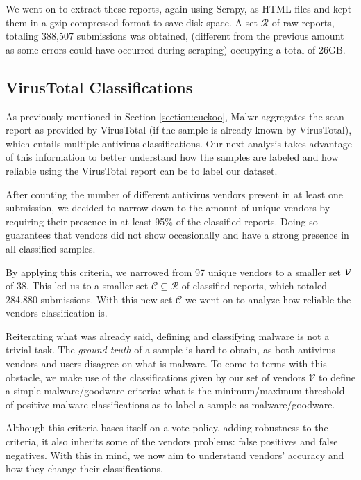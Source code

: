 We went on to extract these reports, again using Scrapy, as HTML files and kept them in a gzip compressed format to save disk space.
A set $\mathcal{R}$ of raw reports, totaling 388,507 submissions was obtained, (different from the
previous amount as some errors could have occurred during scraping) occupying a total of 26GB.

\subsection{VirusTotal Classifications}
\label{subsection:virustotal_classifications}

As previously mentioned in Section \ref{section:cuckoo}, Malwr aggregates the scan report as provided by VirusTotal (if the sample is already known by VirusTotal), which entails multiple antivirus classifications.
Our next analysis takes advantage of this information to better understand how the samples are labeled and how reliable using the VirusTotal report can be to label our dataset.

After counting the number of different antivirus vendors present in at least one submission, we decided to narrow down to the amount of unique vendors by requiring their presence in at least 95\% of the classified reports.
Doing so guarantees that vendors did not show occasionally and have a strong presence in all classified samples.

By applying this criteria, we narrowed from 97 unique vendors to a smaller set $\mathcal{V}$ of 38.
This led us to a smaller set $\mathcal{C}\subseteq\mathcal{R}$ of classified reports, which totaled 284,880 submissions. With this new set $\mathcal{C}$ we went on to analyze how reliable the vendors classification is.

Reiterating what was already said, defining and classifying malware is not a trivial task.
The \textit{ground truth} of a sample is hard to obtain, as both antivirus vendors and users disagree on what is malware.
To come to terms with this obstacle, we make use of the classifications given by our set of vendors $\mathcal{V}$ to define a simple malware/goodware criteria: what is the minimum/maximum threshold of positive malware classifications as to label a sample as malware/goodware.

Although this criteria bases itself on a vote policy, adding robustness to the criteria, it also inherits some of the vendors problems: false positives and false negatives. With this in mind, we now aim to understand vendors' accuracy and how they change their classifications.

